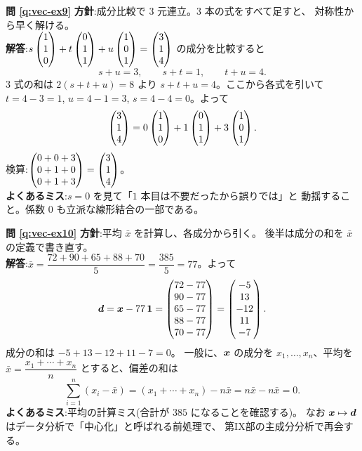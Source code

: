 \bigskip
\noindent\textbf{問 \ref{q:vec-ex9}}\quad
\textbf{方針}:成分比較で $3$ 元連立。$3$ 本の式をすべて足すと、
対称性から早く解ける。\\
\textbf{解答}:$s\begin{pmatrix}1 \\ 1 \\ 0\end{pmatrix} + t\begin{pmatrix}0 \\ 1 \\ 1\end{pmatrix} + u\begin{pmatrix}1 \\ 0 \\ 1\end{pmatrix}
= \begin{pmatrix}3 \\ 1 \\ 4\end{pmatrix}$ の成分を比較すると
\[
s + u = 3, \qquad s + t = 1, \qquad t + u = 4.
\]
$3$ 式の和は $2(s + t + u) = 8$ より $s + t + u = 4$。ここから各式を引いて
$t = 4 - 3 = 1$, $u = 4 - 1 = 3$, $s = 4 - 4 = 0$。よって
\[
\begin{pmatrix}3 \\ 1 \\ 4\end{pmatrix} = 0\begin{pmatrix}1 \\ 1 \\ 0\end{pmatrix} + 1\begin{pmatrix}0 \\ 1 \\ 1\end{pmatrix} + 3\begin{pmatrix}1 \\ 0 \\ 1\end{pmatrix}.
\]
検算:$\begin{pmatrix}0 + 0 + 3 \\ 0 + 1 + 0 \\ 0 + 1 + 3\end{pmatrix} = \begin{pmatrix}3 \\ 1 \\ 4\end{pmatrix}$。\\
\textbf{よくあるミス}:$s = 0$ を見て「$1$ 本目は不要だったから誤りでは」と
動揺すること。係数 $0$ も立派な線形結合の一部である。

\bigskip
\noindent\textbf{問 \ref{q:vec-ex10}}\quad
\textbf{方針}:平均 $\bar{x}$ を計算し、各成分から引く。
後半は成分の和を $\bar{x}$ の定義で書き直す。\\
\textbf{解答}:$\bar{x} = \dfrac{72 + 90 + 65 + 88 + 70}{5}
= \dfrac{385}{5} = 77$。よって
\[
\bm{d} = \bm{x} - 77\,\bm{1}
= \begin{pmatrix}72 - 77 \\ 90 - 77 \\ 65 - 77 \\ 88 - 77 \\ 70 - 77\end{pmatrix}
= \begin{pmatrix}-5 \\ 13 \\ -12 \\ 11 \\ -7\end{pmatrix}.
\]
成分の和は $-5 + 13 - 12 + 11 - 7 = 0$。
一般に、$\bm{x}$ の成分を $x_1, \dots, x_n$、平均を
$\bar{x} = \dfrac{x_1 + \cdots + x_n}{n}$ とすると、偏差の和は
\[
\sum_{i=1}^{n}(x_i - \bar{x}) = (x_1 + \cdots + x_n) - n\bar{x}
= n\bar{x} - n\bar{x} = 0.
\]
\textbf{よくあるミス}:平均の計算ミス(合計が $385$ になることを確認する)。
なお $\bm{x} \mapsto \bm{d}$ はデータ分析で「中心化」と呼ばれる前処理で、
第IX部の主成分分析で再会する。

